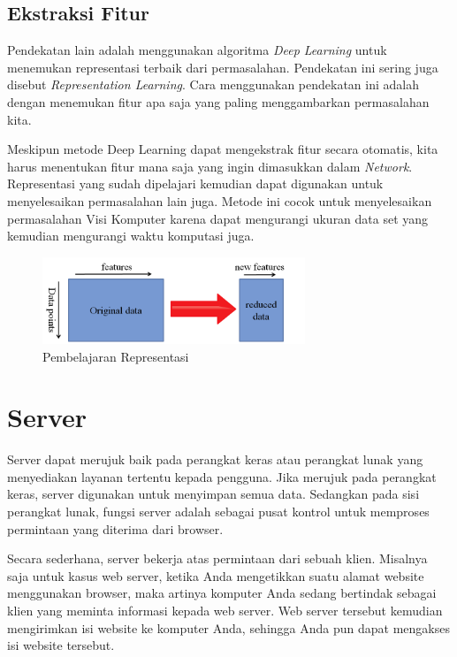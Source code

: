 \subsection{Ekstraksi Fitur}
\par Pendekatan lain adalah menggunakan algoritma \textit{Deep Learning} untuk menemukan representasi terbaik dari permasalahan. Pendekatan ini sering juga disebut \textit{Representation Learning}.  Cara menggunakan pendekatan ini adalah dengan menemukan fitur apa saja yang paling menggambarkan permasalahan kita. 
\par Meskipun metode Deep Learning dapat mengekstrak fitur secara otomatis, kita harus menentukan fitur mana saja yang ingin dimasukkan dalam \textit{Network}. Representasi yang sudah dipelajari kemudian dapat digunakan untuk menyelesaikan permasalahan lain juga. Metode ini cocok untuk menyelesaikan permasalahan Visi Komputer karena dapat mengurangi ukuran data set yang kemudian mengurangi waktu komputasi juga\cite{transfer_how}.

\begin{figure}[ht]
	\centering\includegraphics[width=0.7\textwidth]{bab2/figures/rep_features.png}
	\caption{Pembelajaran Representasi\cite{transfer_how}}
	\label{fig:rep-works}
\end{figure}

\section{Server}
\par Server dapat merujuk baik pada perangkat keras atau perangkat lunak yang menyediakan layanan tertentu kepada pengguna. Jika merujuk pada perangkat keras, server digunakan untuk menyimpan semua data. Sedangkan pada sisi perangkat lunak, fungsi server adalah sebagai pusat kontrol untuk memproses permintaan yang diterima dari browser.

\par Secara sederhana, server bekerja atas permintaan dari sebuah klien. Misalnya saja untuk kasus web server, ketika Anda mengetikkan suatu alamat website menggunakan browser, maka artinya komputer Anda sedang bertindak sebagai klien yang meminta informasi kepada web server. Web server tersebut kemudian mengirimkan isi website ke komputer Anda, sehingga Anda pun dapat mengakses isi website tersebut.

